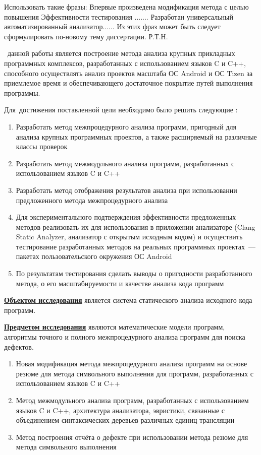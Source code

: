   Использовать такие фразы:
  Впервые произведена модификация метода с целью повышения Эффективности  тестирования ....... 
Разработан универсальный автоматизированный анализатор......
Из этих фраз может быть следует сформулировать по-новому тему диссертации.
   Р.Т.Н. 
   
   
   
\aim\ данной работы является построение метода анализа крупных прикладных программных комплексов, разработанных с использованием языков C и C++, способного осуществлять анализ проектов масштаба ОС Android и ОС Tizen  за приемлемое время и обеспечивающего достаточное покрытие путей выполнения программы.

Для~достижения поставленной цели необходимо было решить следующие {\tasks}:
\begin{enumerate}
  \item Разработать метод межпроцедурного анализа программ, пригодный для анализа крупных программных проектов, а также расширяемый на различные классы проверок
  \item Разработать метод межмодульного анализа программ, разработанных с использованием языков C и C++
  \item Разработать метод отображения результатов анализа при использовании предложенного метода межпроцедурного анализа
  \item Для экспериментального подтверждения эффективности предложенных методов реализовать их для использования в приложении-анализаторе (Clang Static Analyzer, анализатор с открытым исходным кодом) и осуществить тестирование разработанных методов на реальных программных проектах~--- пакетах пользовательского окружения ОС Android
  \item По результатам тестирования сделать выводы о пригодности разработанного метода, о его масштабируемости и качестве анализа кода программ
\end{enumerate}

\underline{\textbf{Объектом исследования}} является система статического анализа исходного кода программ.

\underline{\textbf{Предметом исследования}} являются математические модели программ, алгоритмы точного и полного межпроцедурного анализа программ для поиска дефектов. 

\begin{enumerate}
  \item Новая модификация метода межпроцедурного анализа программ на основе резюме для метода символьного выполнения для программ, разработанных с использованием языков C и C++
  \item Метод межмодульного анализа программ, разработанных с использованием языков C и C++, архитектура анализатора, эвристики, связанные с объединением синтаксических деревьев различных единиц трансляции
  \item Метод построения отчёта о дефекте при использовании метода резюме для метода символьного выполнения
\end{enumerate}

